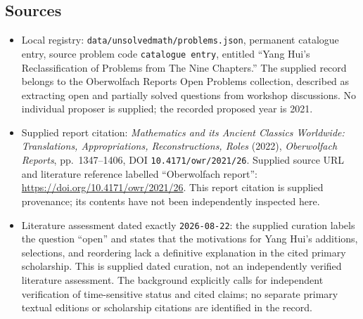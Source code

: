 \documentclass[11pt]{article}
\begin{document}
\subsection{Sources}
\begin{itemize}
\item Local registry: \texttt{data/unsolvedmath/problems.json}, permanent catalogue entry, source problem code \texttt{catalogue entry}, entitled ``Yang Hui's Reclassification of Problems from The Nine Chapters.'' The supplied record belongs to the Oberwolfach Reports Open Problems collection, described as extracting open and partially solved questions from workshop discussions. No individual proposer is supplied; the recorded proposed year is 2021.
\item Supplied report citation: \emph{Mathematics and its Ancient Classics Worldwide: Translations, Appropriations, Reconstructions, Roles} (2022), \emph{Oberwolfach Reports}, pp.\ 1347--1406, DOI \texttt{10.4171/owr/2021/26}. Supplied source URL and literature reference labelled ``Oberwolfach report'': \url{https://doi.org/10.4171/owr/2021/26}. This report citation is supplied provenance; its contents have not been independently inspected here.
\item Literature assessment dated exactly \texttt{2026-08-22}: the supplied curation labels the question ``open'' and states that the motivations for Yang Hui's additions, selections, and reordering lack a definitive explanation in the cited primary scholarship. This is supplied dated curation, not an independently verified literature assessment. The background explicitly calls for independent verification of time-sensitive status and cited claims; no separate primary textual editions or scholarship citations are identified in the record.
\end{itemize}
\end{document}
